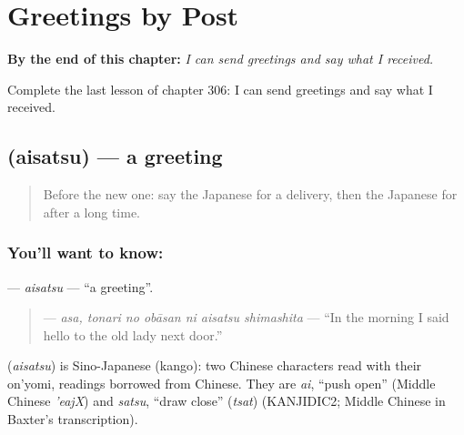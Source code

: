 
\chapter{Greetings by Post}
\label{ch:ja-greetings-by-post}

\begin{chapteropening}
\textbf{By the end of this chapter:} \emph{I can send greetings and say what I received.}

Complete the last lesson of chapter 306: I can send greetings and say what I received.
\end{chapteropening}

\section[\texorpdfstring{\ja{あいさつ} (aisatsu)}{あいさつ (aisatsu)}]{ (aisatsu) — a greeting}

\label{lesson:JA-C306-aisatsu}



\begin{quote}
Before the new one: say the Japanese for a delivery, then the Japanese for after a long time.
\end{quote}

\subsection*{You'll want to know: }
\textbf{} — \emph{aisatsu} — \textquotedblleft{}a greeting\textquotedblright{}.

\begin{quote}
\textbf{  } — \emph{asa, tonari no obāsan ni aisatsu shimashita} — \textquotedblleft{}In the morning I said hello to the old lady next door.\textquotedblright{}
\end{quote}

\begin{cousinweb}
\textbf{} (\emph{aisatsu}) is Sino-Japanese (kango): two Chinese characters read with their on'yomi, readings borrowed from Chinese. They are \emph{ai}, \textquotedblleft{}push open\textquotedblright{} (Middle Chinese \emph{'eajX}) and \emph{satsu}, \textquotedblleft{}draw close\textquotedblright{} (\emph{tsat}) (KANJIDIC2; Middle Chinese in Baxter's transcription).
\end{cousinweb}

